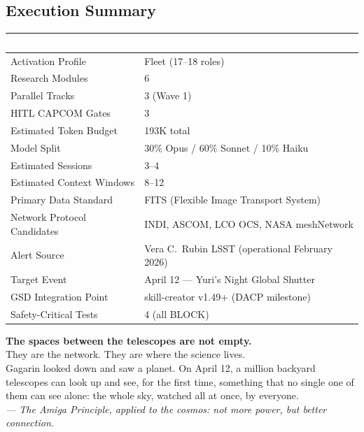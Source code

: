 \documentclass[11pt,letterpaper]{article}
\newcommand{\tableheader}[1]{\textbf{\sffamily\textcolor{white}{#1}}}
\begin{document}
\subsection{Execution Summary}

\begin{center}
\begin{tabularx}{\textwidth}{L{5cm}X}
\toprule
{}
\tableheader{Metric} & \tableheader{Value} \\
\midrule
Activation Profile & Fleet (17--18 roles) \\
Research Modules & 6 \\
Parallel Tracks & 3 (Wave 1) \\
HITL CAPCOM Gates & 3 \\
Estimated Token Budget & 193K total \\
Model Split & 30\% Opus / 60\% Sonnet / 10\% Haiku \\
Estimated Sessions & 3--4 \\
Estimated Context Windows & 8--12 \\
Primary Data Standard & FITS (Flexible Image Transport System) \\
Network Protocol Candidates & INDI, ASCOM, LCO OCS, NASA meshNetwork \\
Alert Source & Vera C.\ Rubin LSST (operational February 2026) \\
Target Event & April 12 --- Yuri's Night Global Shutter \\
GSD Integration Point & skill-creator v1.49+ (DACP milestone) \\
Safety-Critical Tests & 4 (all BLOCK) \\
\bottomrule
\end{tabularx}
\end{center}

\vspace{2em}

\begin{quotebox}
\textbf{\sffamily\large The spaces between the telescopes are not empty.}\\[0.5em]
They are the network. They are where the science lives.\\[0.5em]
Gagarin looked down and saw a planet. On April 12, a million backyard telescopes can look up and see, for the first time, something that no single one of them can see alone: the whole sky, watched all at once, by everyone.\\[1em]
\textit{--- The Amiga Principle, applied to the cosmos: not more power, but better connection.}
\end{quotebox}
\end{document}
